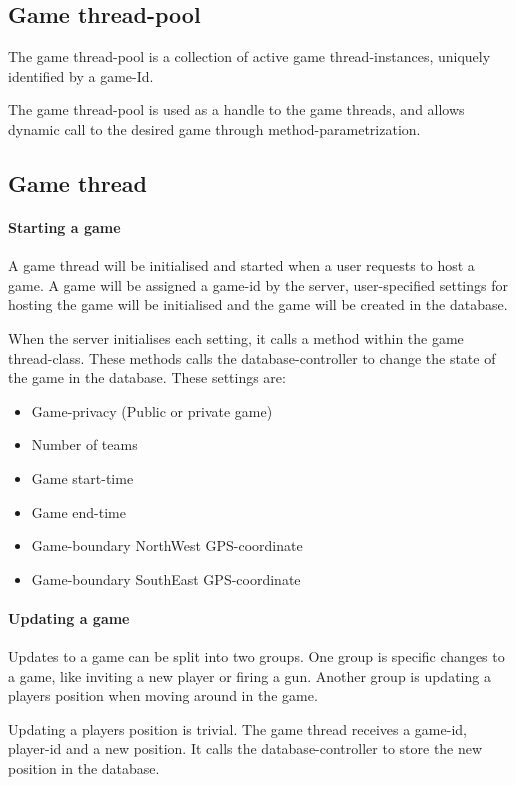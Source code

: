 \subsection{Game thread-pool}
The game thread-pool is a collection of active game thread-instances, uniquely identified by a game-Id.

The game thread-pool is used as a handle to the game threads, and allows dynamic call to the desired game through method-parametrization. 

\subsection{Game thread}
\paragraph{Starting a game}
A game thread will be initialised and started when a user requests to host a game. A game will be assigned a game-id by the server, user-specified settings for hosting the game will be initialised and the game will be created in the database. 

When the server initialises each setting, it calls a method within the game thread-class. These methods calls the database-controller to change the state of the game in the database. These settings are:
\begin{itemize}
\item Game-privacy (Public or private game)
\item Number of teams
\item Game start-time
\item Game end-time
\item Game-boundary NorthWest GPS-coordinate
\item Game-boundary SouthEast GPS-coordinate
\end{itemize}

\paragraph{Updating a game}
Updates to a game can be split into two groups. One group is specific changes to a game, like inviting a new player or firing a gun. Another group is updating a players position when moving around in the game.

Updating a players position is trivial. The game thread receives a game-id, player-id and a new position. It calls the database-controller to store the new position in the database.

